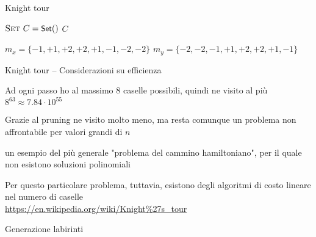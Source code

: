 \begin{frame}{Knight tour}

\vspace{-9pt}
\begin{Procedure}
\caption[A]{\Set {}($\INTEGER[\,][\,]\ S$, \INTEGER $x$, \INTEGER $y$)}
$\textsc{Set}\ C = \textsf{{\small Set}}()$\;
\Return $C$\;
\end{Procedure}

\begin{Procedure}
	$m_x = \{ -1, +1, +2, +2, +1, -1, -2, -2 \}$\;
	$m_y = \{ -2, -2, -1, +1, +2, +2, +1, -1 \}$\;
\end{Procedure}

\end{frame}


\begin{frame}{Knight tour -- Considerazioni su efficienza}

\BIL

\item Ad ogni passo ho al massimo $8$ caselle possibili, quindi ne visito al più $8^{63} \approx 7.84 \cdot 10^{55}$
\item Grazie al pruning ne visito molto meno, ma resta comunque un problema
non affrontabile per valori grandi di $n$
\item \EE un esempio del più generale "problema del cammino hamiltoniano", per il quale non esistono soluzioni polinomiali
\item Per questo particolare problema, tuttavia, esistono degli algoritmi di
costo lineare nel numero di caselle\\
\url{https://en.wikipedia.org/wiki/Knight\%27s_tour}
\EIL

\end{frame}

\begin{frame}{Generazione labirinti}

\end{frame}


